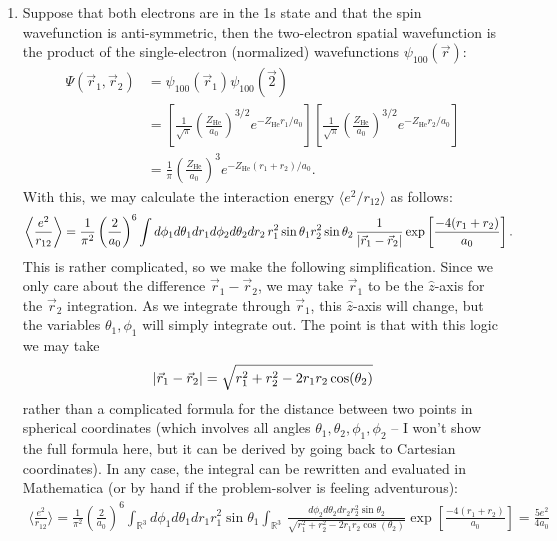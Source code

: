 \documentclass{article}
\theoremstyle{definition}
\newcommand{\f}[2]{\frac{#1}{#2}}
\newcommand{\lp}{\left(}
\newcommand{\rp}{\right)}
\newcommand{\lb}{\left[}
\newcommand{\rb}{\right]}
\begin{document}
\begin{enumerate}[label=(\alph*)]
	\item Suppose that both electrons are in the 1s state and that the spin wavefunction is anti-symmetric, then the two-electron spatial wavefunction is the product of the single-electron (normalized) wavefunctions $\psi_{100}(\vec{r})$:
	\begin{align*}
	\Psi(\vec{r}_1, \vec{r}_2) 
	&= \psi_{100}(\vec{r}_1)\psi_{100}(\vec{2})\\
	&= \lb \f{1}{\sqrt{\pi}} \lp \f{Z_\text{He}}{a_0} \rp^{3/2}  e^{-Z_\text{He} r_1/a_0}\rb 
	\lb \f{1}{\sqrt{\pi}} \lp \f{Z_\text{He}}{a_0} \rp^{3/2}  e^{-Z_\text{He} r_2/a_0} \rb\\
	&= \f{1}{\pi} \lp \f{Z_\text{He}}{a_0} \rp^3 e^{-Z_\text{He}(r_1 + r_2)/a_0}.
	\end{align*}
	With this, we may calculate the interaction energy $\langle e^2/r_{12}\rangle$ as follows: 
	\begin{align*}
	\bigg\langle \f{e^2}{r_{12}}\bigg\rangle 
	&= \f{1}{\pi^2}\lp \f{2}{a_0} \rp^6 \int d\phi_1 d\theta_1 dr_1    d\phi_2 d\theta_2 dr_2 \, r_1^2\sin\theta_1  r_2^2\sin\theta_2 \, \f{1}{\abs{\vec{r}_1 - \vec{r}_2}}\exp\lb \f{-4 (r_1 + r_2)}{a_0} \rb.
	\end{align*}
	This is rather complicated, so we make the following simplification. Since we only care about the difference $\vec{r}_1 - \vec{r}_2$, we may take $\vec{r}_1$ to be the $\hat z$-axis for the $\vec{r}_2$ integration. As we integrate through $\vec{r}_1$, this $\hat{z}$-axis will change, but the variables $\theta_1,\phi_1$ will simply integrate out. The point is that with this logic we may take
	\begin{align*}
	\abs{\vec{r}_1 - \vec{r}_2} = \sqrt{r_1^2 + r_2^2 - 2r_1r_2\cos(\theta_2)} 
	\end{align*}
	rather than a complicated formula for the distance between two points in spherical coordinates (which involves all angles $\theta_1,\theta_2,\phi_1,\phi_2$ -- I won't show the full formula here, but it can be derived by going back to Cartesian coordinates). In any case, the integral can be rewritten and evaluated in Mathematica (or by hand if the problem-solver is feeling adventurous):
	\begin{align*}
	\bigg\langle \f{e^2}{r_{12}}\bigg\rangle 
	= \f{1}{\pi^2}\lp \f{2}{a_0} \rp^6  \int_{\mathbb{R}^3} d\phi_1 d\theta_1 dr_1 r_1^2\sin\theta_1  \int_{\mathbb{R}^3}   \, 
	\f{d\phi_2 d\theta_2 dr_2 r_2^2\sin\theta_2}{\sqrt{r_1^2 + r_2^2 - 2r_1r_2\cos(\theta_2)}}\exp\lb \f{-4 (r_1 + r_2)}{a_0} \rb
	= \boxed{\f{5e^2}{4a_0}}
	\end{align*}  
	

\end{enumerate}
\end{document}
